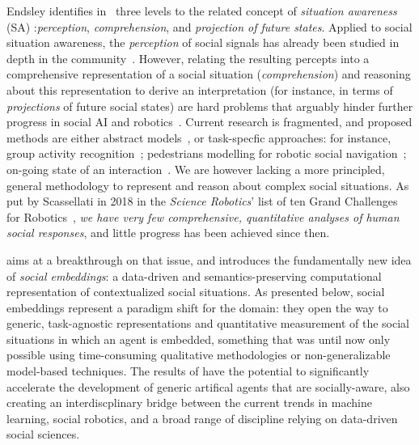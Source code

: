 
Endsley identifies in~\cite{endsley1995theory} three levels to the related concept
of \textit{situation awareness} (SA) :\emph{perception}, \emph{comprehension}, and
\emph{projection of future states}. Applied to social situation awareness,
the \emph{perception} of social signals has already been studied in depth in the
community~\cite{pantic2011social,vinciarelli2009social}.  However, relating the
resulting percepts into a comprehensive representation of a social situation
(\emph{comprehension}) and reasoning about this representation to derive an
interpretation (for instance, in terms of \emph{projections} of future social
states) are hard problems that arguably hinder further progress in social AI and
robotics~\cite{yang2018grand}. Current research is fragmented, and proposed
methods are either abstract models~\cite{gordon2016commonsense}, or task-specfic
approaches: for instance, group activity
recognition~\cite{shu2017cern,wu2019learning}; pedestrians modelling for robotic
social navigation~\cite{alahi2016social}; on-going state of an
interaction~\cite{garcía2020explainable}. We are however lacking a more
principled, general methodology to represent and reason about complex social
situations. As put by Scassellati in 2018 in the \emph{Science Robotics}' list of
ten Grand Challenges for Robotics~\cite{yang2018grand}, \emph{we have very few
comprehensive, quantitative analyses of human social responses}, and little
progress has been achieved since then.

\project aims at a breakthrough on that issue, and introduces the fundamentally new
idea of \emph{social embeddings}: a data-driven and semantics-preserving
computational representation of contextualized social situations.  As presented
below, social embeddings represent a paradigm shift for the domain: they open
the way to generic, task-agnostic representations and quantitative measurement
of the social situations in which an agent is embedded, something that was until
now only possible using time-consuming qualitative methodologies or
non-generalizable model-based techniques.  The results of \project have the
potential to significantly accelerate the development of generic artifical
agents that are socially-aware, also creating an interdiscplinary bridge between
the current trends in machine learning, social robotics, and a broad range of discipline relying
on data-driven social sciences.



